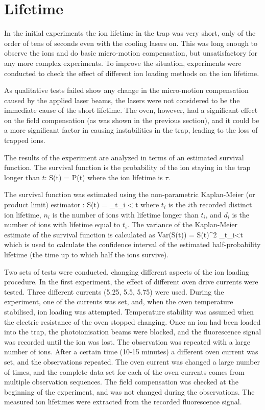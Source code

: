 \section{Lifetime}

In the initial experiments the ion lifetime in the trap was very short, only of the order of tens of seconds even with the cooling lasers on. This was long enough to observe the ions and do basic micro-motion compensation, but unsatisfactory for any more complex experiments. To improve the situation, experiments were conducted to check the effect of different ion loading methods on the ion lifetime.

As qualitative tests failed show any change in the micro-motion compensation caused by the applied laser beams, the lasers were not considered to be the immediate cause of the short lifetime. The \CaI{} oven, however, had a significant effect on the field compensation (as  was shown in the previous section), and it could be a more significant factor in causing instabilities in the trap, leading to the loss of trapped ions.


The results of the experiment are analyzed in terms of an estimated survival function. The survival function is the probability of the ion staying in the trap longer than $t$:
\be
S(t) = P(\tau \geq t)
\ee
where the ion lifetime is $\tau$.

The survival function was estimated using the non-parametric Kaplan-Meier (or product limit) estimator \cite{Kalbfleisch2002}:
\be
\hat S(t) = \prod_{t_i < t} 
\ee
where $t_i$ is the $i$th recorded distinct ion lifetime, $n_i$ is the number of ions with lifetime longer than $t_i$, and $d_i$ is the number of ions with lifetime equal to $t_i$. The variance of the Kaplan-Meier estimate of the survival function is calculated as \be
\mbox{Var}(\hat S(t)) = \hat S(t)^2 \sum_{t_i<t} 
\ee
which is used to calculate the confidence interval of the estimated half-probability lifetime (the time up to which half the ions survive).


Two sets of tests were conducted, changing different aspects of the ion loading procedure. In the first experiment, the effect of different oven drive currents were tested. Three different currents (5.25\A, 5.5\A, 5.75\A) were used. During the experiment, one of the currents was set, and, when the oven temperature stabilised, ion loading was attempted. Temperature stability was assumed when the electric resistance of the \CaI{} oven stopped changing. Once an ion had been loaded into the trap, the photoionisation beams were blocked, and the fluorescence signal was recorded until the ion was lost. The observation was repeated with a large number of ions. After a certain time (10-15 minutes) a different oven current was set, and the observations repeated. The oven current was changed a large number of times, and the complete data set for each of the oven currents comes from multiple observation sequences. The field compensation was checked at the beginning of the experiment, and was not changed during the observations. The measured ion lifetimes were extracted from the recorded fluorescence signal.


